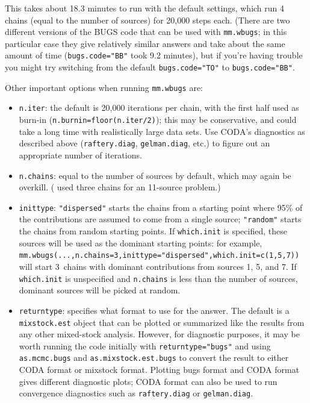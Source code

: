\documentclass[11pt]{article}
\begin{document}
This takes about 18.3 minutes to run with the
default settings, which run 4 chains (equal to the number of
sources) for 20,000 steps each.
(There are two different versions of the BUGS code that can
be used with {\tt mm.wbugs}; in this particular case they
give relatively similar answers and take about the same amount
of time ({\tt bugs.code="BB"} took 9.2 minutes), 
but if you're having trouble you might try switching
from the default {\tt bugs.code="TO"} to {\tt bugs.code="BB"}.

Other important options when running {\tt mm.wbugs} are:
\begin{itemize}
\item {\tt n.iter}: the default is 20,000 iterations per chain, with
  the first half used as burn-in ({\tt n.burnin=floor(n.iter/2)});
  this may be conservative, and could take a long time with
  realistically large data sets.  Use CODA's diagnostics as
  described above ({\tt raftery.diag}, {\tt gelman.diag}, etc.)
  to figure out an appropriate number of iterations.
\item {\tt n.chains}: equal to the number of sources by default,
  which may again be overkill.  (\cite{Bolker+07} used three chains
  for an 11-source problem.)
\item {\tt inittype}: {\tt "dispersed"} starts the chains from 
  a starting point where 95\% of the contributions are assumed to
  come from a single source; {\tt "random"} starts the chains from
  random starting points.  If {\tt which.init} is specified, these
  sources will be used as the dominant starting points: for example,
  {\tt mm.wbugs(...,n.chains=3,inittype="dispersed",which.init=c(1,5,7))} will 
  start 3~chains with dominant contributions from sources 1, 5, and 7.  If
  {\tt which.init} is unspecified and {\tt n.chains} is less than the
  number of sources, dominant sources will be picked at random.
\item {\tt returntype}: specifies what format to use for the answer.
  The default is a {\tt mixstock.est} object that can be plotted
  or summarized like the results from any other mixed-stock analysis.
  However, for diagnostic purposes, it may be worth running the
  code initially with {\tt returntype="bugs"}
  and using {\tt as.mcmc.bugs} and {\tt as.mixstock.est.bugs}
  to convert the result to either CODA format or mixstock
  format.  Plotting bugs format and CODA format gives different
  diagnostic plots; CODA format can also be used to run
  convergence diagnostics such as {\tt raftery.diag} or
  {\tt gelman.diag}.
\end{itemize}
\end{document}
